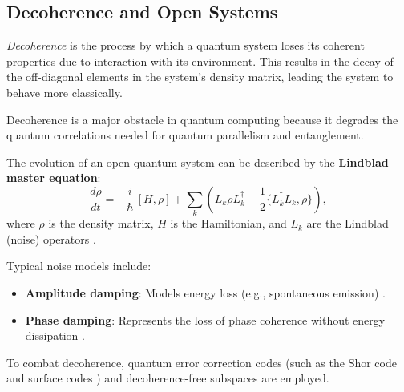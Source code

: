 
\subsection{Decoherence and Open Systems}
\label{subsec:decoherence}

\begin{definition}[Decoherence]
\emph{Decoherence} is the process by which a quantum system loses its coherent properties due to interaction with its environment. This results in the decay of the off-diagonal elements in the system's density matrix, leading the system to behave more classically.
\end{definition}

\begin{remark}
Decoherence is a major obstacle in quantum computing because it degrades the quantum correlations needed for quantum parallelism and entanglement.
\end{remark}

\begin{definition}
The evolution of an open quantum system can be described by the \textbf{Lindblad master equation}:
\[
\frac{d\rho}{dt} = -\frac{i}{\hbar}\,[H, \rho] + \sum_k \left( L_k \rho L_k^\dagger - \frac{1}{2}\{L_k^\dagger L_k, \rho\} \right),
\]
where \(\rho\) is the density matrix, \(H\) is the Hamiltonian, and \(L_k\) are the Lindblad (noise) operators \cite{breuer2002theory}.
\end{definition}

\begin{example}
    Typical noise models include:
    \begin{itemize}
        \item \textbf{Amplitude damping}: Models energy loss (e.g., spontaneous emission) \cite{nielsen2010quantum}.
        \item \textbf{Phase damping}: Represents the loss of phase coherence without energy dissipation \cite{nielsen2010quantum}.
    \end{itemize}
\end{example}

\begin{observation}
    To combat decoherence, quantum error correction codes (such as the Shor code \cite{shor1995scheme} and surface codes \cite{fowler2012surface}) and decoherence-free subspaces are employed.
\end{observation}

